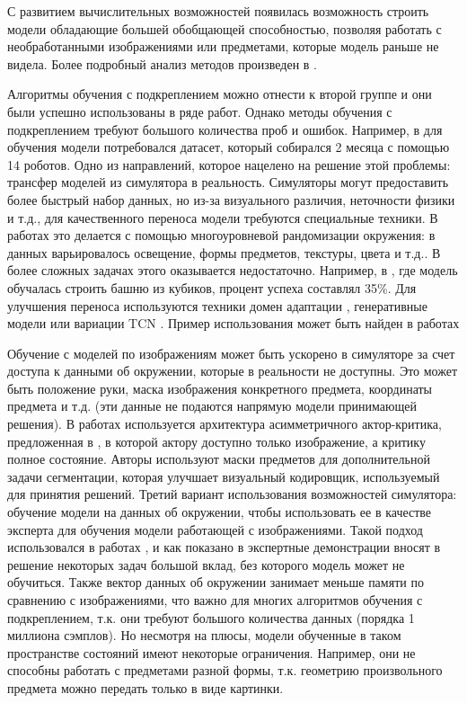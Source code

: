 \documentclass{mipt-thesis-bs}
\begin{document}
С развитием вычислительных возможностей появилась возможность строить модели обладающие большей обобщающей способностью, позволяя работать с необработанными изображениями или предметами, которые модель раньше не видела. Более подробный анализ методов произведен в \cite{survey}.

Алгоритмы обучения с подкреплением можно отнести к второй группе и они были успешно использованы в ряде работ. Однако методы обучения с подкреплением требуют большого количества проб и ошибок. Например, в \cite{levine} для обучения модели потребовался датасет, который собирался 2 месяца с помощью 14 роботов. Одно из направлений, которое нацелено на решение этой проблемы: трансфер моделей из симулятора в реальность. 
Симуляторы могут предоставить более быстрый набор данных, но из-за визуального различия, неточности физики и т.д., для качественного переноса модели требуются специальные техники. В работах \cite{abbel, james1, james2} это делается с помощью многоуровневой рандомизации окружения: в данных варьировалось освещение, формы предметов, текстуры, цвета и т.д.. В более сложных задачах этого оказывается недостаточно. Например, в \cite{0.35}, где модель обучалась строить башню из кубиков, процент успеха составлял 35\%. Для улучшения переноса используются техники домен адаптации \cite{dann}, генеративные модели \cite{gann} или вариации TCN \cite{tcn}. Пример использования может быть найден в работах \cite{danngann, jamesgann,  aytar} 

Обучение с моделей по изображениям может быть ускорено в симуляторе за счет доступа к данными об окружении, которые в реальности не доступны. Это может быть положение руки, маска изображения конкретного предмета, координаты предмета и т.д. (эти данные не подаются напрямую модели принимающей решения). В работах \cite{james2, 0.35} используется архитектура асимметричного актор-критика, предложенная в \cite{assym-ac}, в которой актору доступно только изображение, а критику полное состояние. 
Авторы \cite{jamesgann} используют маски предметов для дополнительной задачи сегментации, которая улучшает визуальный кодировщик, используемый для принятия решений. 
Третий вариант использования возможностей симулятора: обучение модели на данных об окружении, чтобы использовать ее в качестве эксперта для обучения модели работающей с изображениями. Такой подход использовался в работах \cite{aytar, bcfeat}, и как показано в \cite{aytar, abbel2} экспертные демонстрации вносят в решение некоторых задач большой вклад, без которого модель может не обучиться.
Также вектор данных об окружении занимает меньше памяти по сравнению с изображениями, что важно для многих алгоритмов обучения с подкреплением, т.к. они требуют большого количества данных (порядка 1 миллиона сэмплов).
Но несмотря на плюсы, модели обученные в таком пространстве состояний имеют некоторые ограничения. Например, они не способны работать с предметами разной формы, т.к. геометрию произвольного предмета можно передать только в виде картинки.
\end{document}

